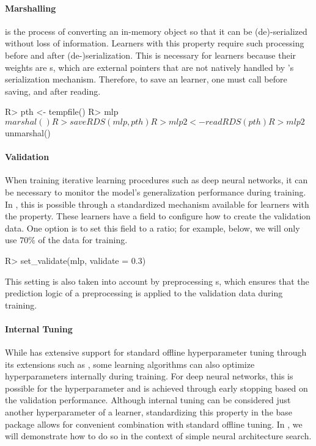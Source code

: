 \documentclass[article]{jss}
\theoremstyle{definition}
\begin{document}
\paragraph{Marshalling} is the process of converting an in-memory object so that it can be (de)-serialized without loss of information.
Learners with this property require such processing before and after (de-)serialization.
This is necessary for \torch{} learners because their weights are s, which are external pointers that are not natively handled by \rlang{}'s serialization mechanism.
Therefore, to save an \mlrttorch{} learner, one must call  before saving, and  after reading.

\begin{CodeInput}
R> pth <- tempfile()
R> mlp$marshal()
R> saveRDS(mlp, pth)
R> mlp2 <- readRDS(pth)
R> mlp2$unmarshal()
\end{CodeInput}

\paragraph{Validation}

When training iterative learning procedures such as deep neural networks, it can be necessary to monitor the model's generalization performance during training.
In \mlrt{}, this is possible through a standardized mechanism available for learners with the  property.
These learners have a  field to configure how to create the validation data.
One option is to set this field to a ratio; for example, below, we will only use $70\%$ of the data for training.

\begin{CodeInput}
R> set_validate(mlp, validate = 0.3)
\end{CodeInput}

This setting is also taken into account by preprocessing s, which ensures that the prediction logic of a preprocessing  is applied to the validation data during training.

\paragraph{Internal Tuning}

While \mlrt{} has extensive support for standard offline hyperparameter tuning through its extensions such as  \citep{ref-mlr3tuning2024}, some learning algorithms can also optimize hyperparameters internally during training.
For deep neural networks, this is possible for the  hyperparameter and is achieved through early stopping based on the validation performance.
Although internal tuning can be considered just another hyperparameter of a learner, standardizing this property in the \mlrt{} base package allows for convenient combination with standard offline tuning.
In , we will demonstrate how to do so in the context of simple neural architecture search.
\end{document}
